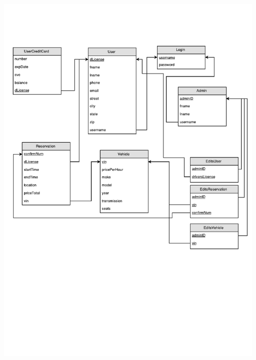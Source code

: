 \documentclass[12pt]{article}
\begin{document}
\includegraphics[scale=0.8]{carRentalSchema.pdf}
\end{document}
